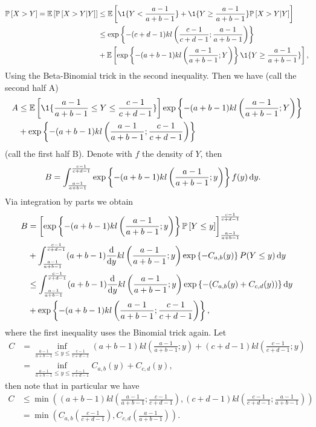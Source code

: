 	\begin{align*}
		\PP{X > Y} = \EE{ \PP{X > Y | Y}}
		&\leq \EE{\1{\{ Y < \frac{a-1}{a+b-1}  \} } + \1{\{ Y \geq \frac{a-1}{a+b-1} \} } \PP{X > Y | Y}  } \\
		&\leq \expp{- (c+d-1) kl\left(\frac{c-1}{c+d-1}; \frac{a-1}{a+b-1}\right) } \\
		&+ \EE{ \expp{-(a + b -1) kl\left(\frac{a-1}{a+b-1}; Y\right)}\1{\{ Y \geq \frac{a-1}{a+b-1} \} } },
	\end{align*}
	Using the Beta-Binomial trick in the second inequality.	Then we have (call the second half A)
	\begin{align*}
	A &\leq \EE{\1{\{ \frac{a-1}{a+b-1} \leq Y \leq \frac{c-1}{c+d-1}\}}}  \expp{-(a + b -1) kl\left(\frac{a-1}{a+b-1}; Y\right)}\\
	&+ \expp{-(a+b-1) kl\left( \frac{a-1}{a+b-1} ; \frac{c-1}{c+d-1} \right)}\\
	\end{align*}
	(call the first half B). Denote with $f$ the density of $Y$, then
	\begin{align*}
	B &= \int_{\frac{a-1}{a+b-1}}^{\frac{c-1}{c+d-1}} \exp\left\{-(a+b-1) kl\left( \frac{a-1}{a+b-1}; y\right)\right\} f(y) \mathop{}\!\mathrm{d}{y}.
	\end{align*}
	Via integration by parts we obtain
	\begin{align*}
	B &= \left[ \exp\left\{-(a+b-1) kl\left( \frac{a-1}{a+b-1}; y\right)\right\} \mathbb{P}\left[Y \leq y\right] \right]_{\frac{a-1}{a+b-1}}^{\frac{c-1}{c+d-1}}\\
	&+ \int_{\frac{a-1}{a+b-1}}^{\frac{c-1}{c+d-1}} (a+b-1) \frac{\operatorname{d}\!{}}{\operatorname{d}\!{y}} kl\left(\frac{a-1}{a+b-1} ; y\right) \exp\left\{-C_{a,b}(y) \right\} P(Y \leq y) \mathop{}\!\mathrm{d}{y}\\
	&\leq \int_{\frac{a-1}{a+b-1}}^{\frac{c-1}{c+d-1}} (a+b-1) \frac{\operatorname{d}\!{}}{\operatorname{d}\!{y}} kl\left(\frac{a-1}{a+b-1} ; y\right)
	\exp\left\{-(C_{a,b}(y)+C_{c,d}(y)) \right\} \mathop{}\!\mathrm{d}{y}\\
	&+ \exp\left\{-(a+b-1)kl\left(\frac{a-1}{a+b-1}; \frac{c-1}{c+d-1}\right)\right\},
	\end{align*}
	where the first inequality uses the Binomial trick again. Let
	\begin{align*}
	C &= \inf_{\frac{a-1}{a+b-1} \leq y \leq \frac{c-1}{c+d-1}} (a+b-1) kl\left(\frac{a-1}{a+b-1}; y\right) + (c+d-1) kl\left(\frac{c-1}{c+d-1} ; y\right)  \\ 
	&= \inf_{\frac{a-1}{a+b-1} \leq y \leq \frac{c-1}{c+d-1}} C_{a,b}(y)+C_{c,d}(y),
	\end{align*}
	then note that in particular we have
	\begin{align*}
	C &\leq \min \left( (a+b-1) kl\left(\frac{a-1}{a+b-1}; \frac{c-1}{c+d-1}\right), (c+d-1) kl \left(\frac{c-1}{c+d-1} ; \frac{a-1}{a+b-1}\right) \right)\\
	  &= \min \left(C_{a,b}\left(\frac{c-1}{c+d-1}\right), C_{c,d}\left(\frac{a-1}{a+b-1}\right)\right).
	\end{align*}
